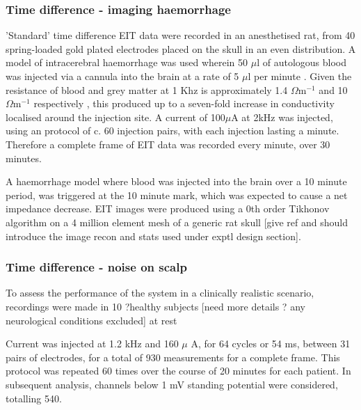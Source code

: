 \subsubsection{Time difference - imaging haemorrhage}
\label{methodsTD}
'Standard' time difference EIT data were recorded in an anesthetised rat, from 40 spring-loaded gold plated electrodes placed on the skull in an even distribution. A model of intracerebral haemorrhage was used wherein 50 $\mu$l of autologous blood was injected via a cannula into the brain at a rate of 5 $\mu$l per minute \cite{Dowrick_2016}. Given the resistance of blood and grey matter at 1 Khz is approximately 1.4 $\Omega {\text{m}}^{-1}$ and 10 $\Omega {\text{m}}^{-1}$ respectively \cite{Gabriel_2009}, this produced up to a seven-fold increase in conductivity localised around the injection site. A current of 100\( \mu \)A at 2kHz was injected, using an protocol of c. 60 injection pairs, with each injection lasting a minute. Therefore a complete frame of EIT data was recorded every minute, over 30 minutes. 





A haemorrhage model where blood was injected into the brain over a 10 minute period, was triggered at the 10 minute mark, which was expected to cause a net impedance decrease. EIT images were produced using a 0th order Tikhonov algorithm on a 4 million element mesh of a generic rat skull [give ref and should introduce the image recon and stats used under exptl design section].

\subsubsection{Time difference - noise on scalp}

To assess the performance of the system in a clinically realistic scenario, recordings were made in 10 ?healthy subjects [need more details ? any neurological conditions excluded] at rest 



Current was injected at 1.2 kHz and 160 $\mu$ A, for 64 cycles or 54 ms, between 31 pairs of electrodes, for a total of 930 measurements for a complete frame. This protocol was repeated 60 times over the course of 20 minutes for each patient. In subsequent analysis, channels below 1 mV standing potential were considered, totalling 540. 